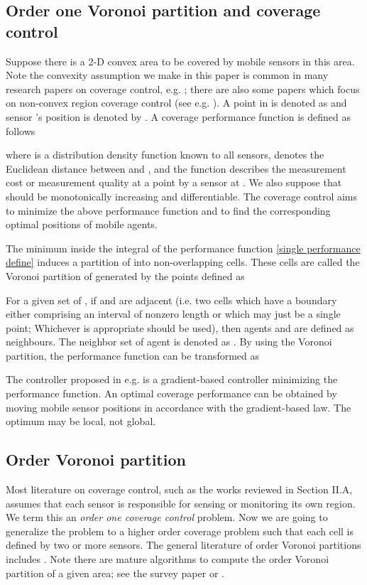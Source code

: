 \documentclass[letterpaper, 10 pt, conference]{ieeeconf}
\begin{document}
\subsection{Order one Voronoi partition and coverage control}
\label{Background}
Suppose there is a 2-D convex area  to be covered by  mobile sensors in this area. Note the convexity assumption we make in this paper is common in many research papers on coverage control, e.g. \cite{cortes2004coverage, schwager2009decentralized}; there are also some papers which focus on non-convex region coverage control (see e.g. \cite{breitenmoser2010voronoi}). A point in  is denoted as  and sensor 's position is denoted by . A coverage performance function  is defined as follows

where  is a distribution density function known to all sensors,  denotes the Euclidean distance between  and , and
the function  describes the measurement cost or measurement quality at a point  by a sensor at . We also suppose that  should be monotonically increasing and differentiable. The coverage control aims to  minimize the above performance function and to find the corresponding optimal positions of mobile agents.

The minimum inside the integral of the performance function \eqref{single performance define} induces a partition of  into non-overlapping cells. These cells   are called the Voronoi partition  of  generated by the points  defined as

For a given set of , if  and  are adjacent (i.e. two cells which have a boundary either comprising an interval of nonzero length or which may just be a single point; Whichever is appropriate should be used), then agents   and   are defined as neighbours. The neighbor set of agent  is denoted as .
By using the Voronoi partition, the performance function can be transformed as

The controller proposed in e.g. \cite{cortes2004coverage} is a gradient-based controller minimizing the performance function. An optimal coverage performance can be obtained by moving mobile sensor positions in accordance with the gradient-based law. The optimum may be local, not global.

\subsection{Order  Voronoi partition}
Most literature on coverage control, such as the works reviewed in Section II.A, assumes that each sensor is responsible for sensing or monitoring   its own region.
We term this an \emph{order one coverage control} problem.
Now we are going to generalize the problem to a higher order coverage problem such that each cell is defined by two or more sensors.
The general literature of order  Voronoi partitions includes \cite{aurenhammer1991voronoi,boissonnat1993semidynamic}. Note there are mature algorithms to compute the order  Voronoi partition of a given area; see the survey paper \cite{aurenhammer1991voronoi} or \cite{agarwal1998constructing}.
\end{document}

